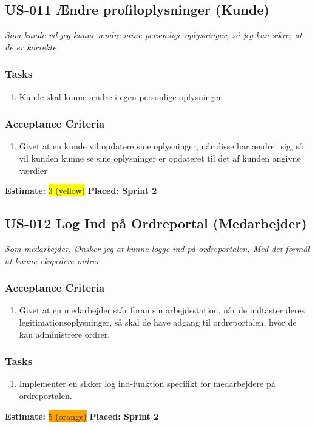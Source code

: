 \subsection{US-011 Ændre profiloplysninger (Kunde)}
\label{sec:US-011}
\textit{Som kunde vil jeg kunne ændre mine personlige oplysninger, så jeg kan sikre, at de er korrekte.}
\subsubsection*{\textbf{Tasks}}
\begin{enumerate}
  \item Kunde skal kunne ændre i egen personlige oplysninger
\end{enumerate}
\subsubsection*{\textbf{Acceptance Criteria}}
\begin{enumerate}
  \item Givet at en kunde vil opdatere sine oplysninger, når disse har ændret sig, så vil kunden kunne se sine oplysninger er opdateret til det af kunden angivne værdier
\end{enumerate}
\textbf{Estimate:} \colorbox{yellow}{3 (yellow)}
\textbf{Placed: Sprint 2}
\par\noindent\dotfill

\subsection{US-012 Log Ind på Ordreportal (Medarbejder)}
\label{sec:US-012}
\textit{Som medarbejder, Ønsker jeg at kunne logge ind på ordreportalen, Med det formål at kunne ekspedere ordrer.}
\subsubsection*{\textbf{Acceptance Criteria}}
\begin{enumerate}
  \item Givet at en medarbejder står foran sin arbejdsstation, når de indtaster deres legitimationsoplysninger, så skal de have adgang til ordreportalen, hvor de kan administrere ordrer.
\end{enumerate}
\subsubsection*{\textbf{Tasks}}
\begin{enumerate}
  \item Implementer en sikker log ind-funktion specifikt for medarbejdere på ordreportalen.
\end{enumerate}
\textbf{Estimate:} \colorbox{orange}{5 (orange)}
\textbf{Placed: Sprint 2}
\par\noindent\dotfill

